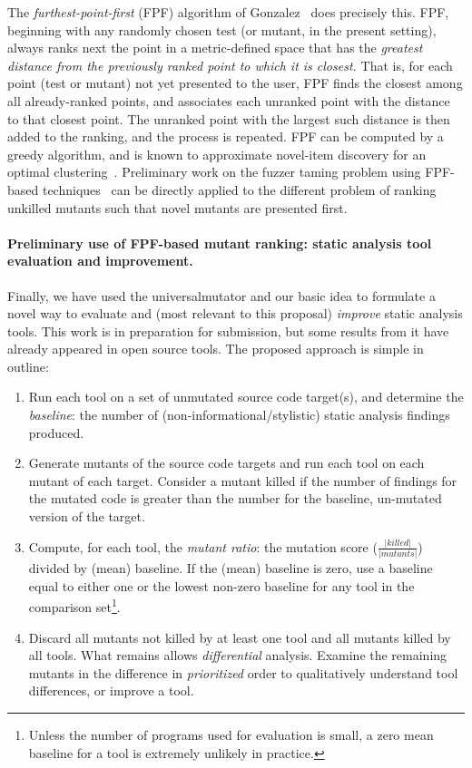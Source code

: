 The \emph{furthest-point-first} (FPF) algorithm of
Gonzalez~\cite{Gonzalez85} does precisely this.  FPF, beginning with
any randomly chosen test (or mutant, in the present setting), always ranks
next the point in a metric-defined space that has the \emph{greatest
  distance from the previously ranked point to which it is closest.}
That is, for each point (test or mutant) not yet presented to the
user, FPF finds the closest among all already-ranked points, and
associates each unranked point with the distance to that closest
point.  The unranked point with the largest such distance is then
added to the ranking, and the process is repeated.  FPF can be
computed by a greedy algorithm, and is known to approximate novel-item
discovery for an optimal clustering~\cite{Gonzalez85}.  Preliminary work on the fuzzer taming problem using FPF-based
techniques~\cite{PLDI13,distMut} can be directly applied
to the different problem of ranking
unkilled mutants such that novel mutants are presented first.  %

\paragraph{Preliminary use of FPF-based mutant ranking: static
  analysis tool evaluation and improvement.}

Finally, we have used the universalmutator and our basic idea to
formulate a novel way to evaluate and (most relevant to this proposal)
\emph{improve} static analysis tools.  This work is in preparation for
submission, but some results from it have already appeared in open
source tools.  The proposed approach is simple in outline:

\begin{enumerate}
\item Run each tool on a set of unmutated source code target(s), and
  determine the \emph{baseline}: the number of
  (non-informational/stylistic) static analysis findings produced.
\item Generate mutants of the source code targets and run each tool on
  each mutant of each target.  Consider a mutant killed if the number
  of findings for the mutated code is greater than the number for the
  baseline, un-mutated version of the target.
\item Compute, for each tool, the \emph{mutant ratio}:  the mutation score ($\frac{|\mathit{killed}|}{|\mathit{mutants}|}$) divided by (mean) baseline.  If the (mean) baseline is zero, use a baseline equal to either one or the lowest non-zero baseline for any tool in the comparison set\footnote{Unless the number of programs used for evaluation is small, a zero mean baseline for a tool is extremely unlikely in practice.}.
\item Discard all mutants not killed by at least one tool and all mutants killed by all tools.  What remains allows \emph{differential} analysis.
Examine the remaining mutants in the difference in \emph{prioritized} order to qualitatively understand tool differences, or improve a tool.
\end{enumerate}

